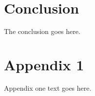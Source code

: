 \documentclass[journal,comsoc]{IEEEtran}
\begin{document}




\section{Conclusion}
The conclusion goes here.






%


\appendices
\section{Appendix 1}
Appendix one text goes here.

\ifCLASSOPTIONcaptionsoff
  \newpage
\fi
\end{document}
